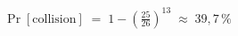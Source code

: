 \documentclass[preview]{standalone}
\begin{document}
\begin{align*}
\Pr[\text{collision}] \;=\; 1 - \left(\frac{25}{26}\right)^{13} \;\approx\; 39{,}7\,\%
\end{align*}
\end{document}
